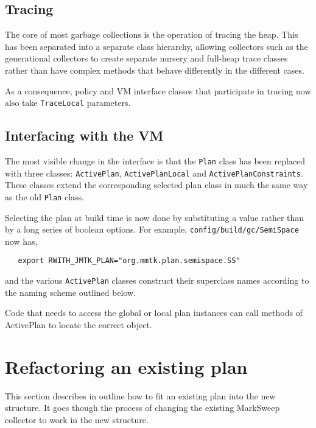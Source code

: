 \documentclass[10pt]{article}
\newcommand{\code}[1]{\lstinline!#1!}
\begin{document}
\subsection{Tracing}

The core of most garbage collections is the operation of tracing the
heap.  This has been separated into a separate class hierarchy,
allowing collectors such as the generational collectors to create
separate nursery and full-heap trace classes rather than have complex
methods that behave differently in the different cases.

As a consequence, policy and VM interface classes that participate in
tracing now also take \code{TraceLocal} parameters.

\subsection{Interfacing with the VM}

The most visible change in the interface is that the \code{Plan} class
has been replaced with three classes: \code{ActivePlan},
\code{ActivePlanLocal} and \code{ActivePlanConstraints}.  These classes
extend the corresponding selected plan class in much the same
way as the old \code{Plan} class.

Selecting the plan at build time is now done by substituting a value
rather than by a long series of boolean options.  For example,
\code{config/build/gc/SemiSpace} now has,
\begin{lstlisting}
   export RWITH_JMTK_PLAN="org.mmtk.plan.semispace.SS"
\end{lstlisting} 
and the various \code{ActivePlan} classes construct their superclass
names according to the naming scheme outlined below.

Code that needs to access the global or local plan instances can call
methods of ActivePlan to locate the correct object.

\section{Refactoring an existing plan}

This section describes in outline how to fit an existing plan into the
new structure.  It goes though the process of changing the existing
MarkSweep collector to work in the new structure.
\end{document}
